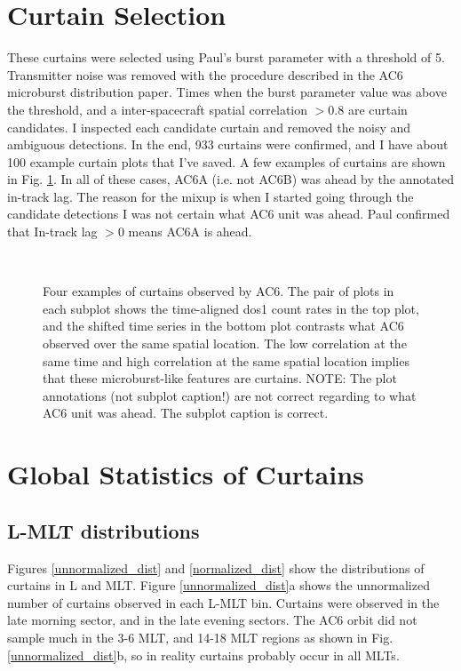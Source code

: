 \documentclass[
10pt, %
a4paper, %
oneside, %
headinclude,footinclude, %
BCOR5mm, %
]{scrartcl}
\begin{document}
\section{Curtain Selection}
These curtains were selected using Paul's burst parameter with a threshold of 5. Transmitter noise was removed with the procedure described in the AC6 microburst distribution paper. Times when the burst parameter value was above the threshold, and a inter-spacecraft spatial correlation $> 0.8$ are curtain candidates. I inspected each candidate curtain and removed the noisy and ambiguous detections. In the end, 933 curtains were confirmed, and I have about 100 example curtain plots that I've saved. A few examples of curtains are shown in Fig. \ref{curtain_examples}. In all of these cases, AC6A (i.e. not AC6B) was ahead by the annotated in-track lag. The reason for the mixup is when I started going through the candidate detections I was not certain what AC6 unit was ahead. Paul confirmed that In-track lag $ > 0$ means AC6A is ahead.


\begin{figure}[htb]
\centering
{} \quad
{} \\
 \quad
{}
\caption[Curtain examples]{Four examples of curtains observed by AC6. The pair of plots in each subplot shows the time-aligned dos1 count rates in the top plot, and the shifted time series in the bottom plot contrasts what AC6 observed over the same spatial location. The low correlation at the same time and high correlation at the same spatial location implies that these microburst-like features are curtains. NOTE: The plot annotations (not subplot caption!) are not correct regarding to what AC6 unit was ahead. The subplot caption is correct.}
\label{curtain_examples}
\end{figure}

\section{Global Statistics of Curtains}

\subsection{L-MLT distributions}
Figures \ref{unnormalized_dist} and \ref{normalized_dist} show the distributions of curtains in L and MLT. Figure \ref{unnormalized_dist}a shows the unnormalized number of curtains observed in each L-MLT bin. Curtains were observed in the late morning sector, and in the late evening sectors. The AC6 orbit did not sample much in the 3-6 MLT, and 14-18 MLT regions as shown in Fig. \ref{unnormalized_dist}b, so in reality curtains probably occur in all MLTs.
\end{document}
